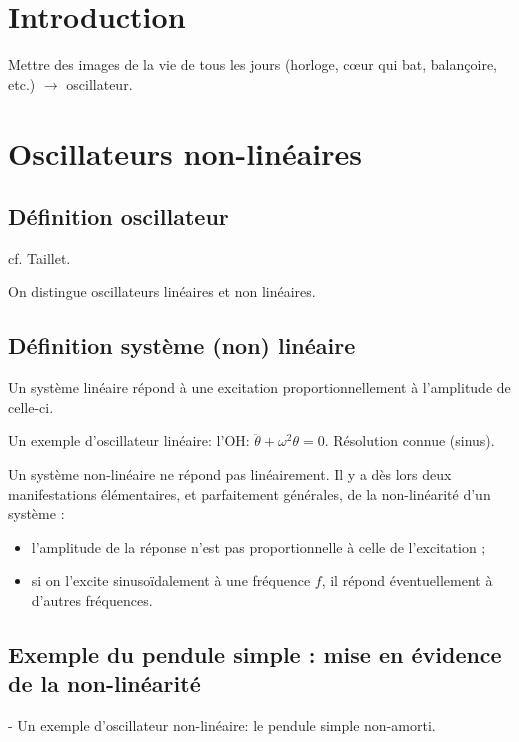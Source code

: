 \documentclass[11pt]{report}
\numberwithin{figure}{section}
\numberwithin{equation}{section}
\numberwithin{table}{section}
\newcommand{\1}{\boldsymbol{1}}
\begin{document}
\section*{Introduction}

Mettre des images de la vie de tous les jours (horloge, cœur qui bat, balançoire, etc.) $\rightarrow$ oscillateur.

\section{Oscillateurs non-linéaires}

\subsection{Définition oscillateur}

cf. Taillet.

On distingue oscillateurs linéaires et non linéaires.

\subsection{Définition système (non) linéaire}

Un système linéaire répond à une excitation proportionnellement à l'amplitude de celle-ci. 

Un exemple d'oscillateur linéaire: l'OH: $\ddot{\theta} + \omega^2 \theta = 0$. Résolution connue (sinus). 


Un système non-linéaire ne répond pas linéairement. Il y a dès lors deux manifestations élémentaires, et parfaitement générales, de la non-linéarité d'un système :

\begin{itemize}
\item l'amplitude de la réponse n'est pas proportionnelle à celle de l'excitation ;
\item si on l'excite sinusoïdalement à une fréquence $f$, il répond éventuellement à d'autres fréquences.
\end{itemize}

\subsection{Exemple du pendule simple : mise en évidence de la non-linéarité}

- Un exemple d'oscillateur non-linéaire: le pendule simple non-amorti.
\end{document}
